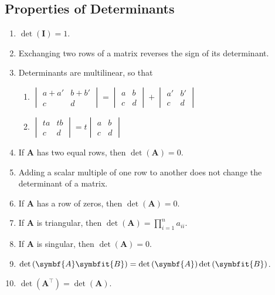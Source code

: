 \documentclass{article}
\begin{document}
\subsection{Properties of Determinants}
\begin{enumerate}
    \item \(\det{\left( \symbf{I} \right)}=1\).
    \item Exchanging two rows of a matrix reverses the sign of its
          determinant.
    \item Determinants are multilinear, so that
          \begin{enumerate}[label=(\alph*)]
              \item \(
                    \begin{vmatrix}
                        a+a' & b+b' \\
                        c    & d
                    \end{vmatrix}
                    =
                    \begin{vmatrix}
                        a & b \\
                        c & d
                    \end{vmatrix}
                    +
                    \begin{vmatrix}
                        a' & b' \\
                        c  & d
                    \end{vmatrix}
                    \)
              \item \(
                    \begin{vmatrix}
                        ta & tb \\
                        c  & d
                    \end{vmatrix}
                    = t
                    \begin{vmatrix}
                        a & b \\
                        c & d
                    \end{vmatrix}
                    \)
          \end{enumerate}
    \item If \(\symbf{A}\) has two equal rows, then
          \(\det{\left( \symbf{A} \right)}=0\).
    \item Adding a scalar multiple of one row to another does not change
          the determinant of a matrix.
    \item If \(\symbf{A}\) has a row of zeros, then
          \(\det{\left( \symbf{A} \right)}=0\).
    \item If \(\symbf{A}\) is triangular, then
          \(\det{\left( \symbf{A} \right)}=\prod_{i=1}^{n} a_{ii}\).
    \item If \(\symbf{A}\) is singular, then
          \(\det{\left( \symbf{A} \right)}=0\).
    \item \(\det{\left( \symbf{A}\symbfit{B} \right)}=\det{\left( \symbf{A} \right)}\det{\left( \symbfit{B} \right)}\).
    \item \(\det{\left( \symbf{A}^\top \right)}=\det{\left( \symbf{A} \right)}\).
\end{enumerate}
\end{document}
